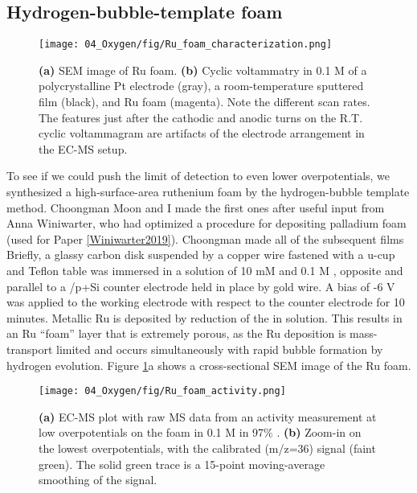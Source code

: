 \subsection{Hydrogen-bubble-template  foam}\label{subsec:Ru_foam}

\begin{figure}[t!]
	\centering
	\texttt{[image: 04\_Oxygen/fig/Ru\_foam\_characterization.png]}
	\caption{\textbf{(a)} SEM image of Ru foam. \textbf{(b)} Cyclic voltammatry in 0.1 M  of a polycrystalline Pt electrode (gray), a room-temperature sputtered  film (black), and Ru foam (magenta). Note the different scan rates. The features just after the cathodic and anodic turns on the R.T.  cyclic voltammagram are artifacts of the electrode arrangement in the EC-MS setup.}
	\label{fig:Ru_foam_char}
\end{figure}

To see if we could push the limit of  detection to even lower overpotentials, we synthesized a high-surface-area ruthenium foam by the hydrogen-bubble template method. Choongman Moon and I made the first ones after useful input from Anna Winiwarter, who had optimized a procedure for depositing palladium foam (used for Paper \ref{Winiwarter2019}). Choongman made all of the subsequent films Briefly, a glassy carbon disk suspended by a copper wire fastened with a u-cup and Teflon table was immersed in a solution of 10 mM  and 0.1 M , opposite and parallel to a /p+Si counter electrode held in place by gold wire. A bias of -6 V was applied to the working electrode with respect to the counter electrode for 10 minutes. Metallic Ru is deposited by reduction of the  in solution. This results in an Ru ``foam'' layer that is extremely porous, as the Ru deposition is mass-transport limited and occurs simultaneously with rapid bubble formation by hydrogen evolution. Figure \ref{fig:Ru_foam_char}a shows a cross-sectional SEM image of the Ru foam.

\begin{figure}[b!]
	\centering
	\texttt{[image: 04\_Oxygen/fig/Ru\_foam\_activity.png]}
	\caption{\textbf{(a)} EC-MS plot with raw MS data from an activity measurement at low overpotentials on the  foam in 0.1 M  in 97\% . \textbf{(b)} Zoom-in on the lowest overpotentials, with the calibrated  (m/z=36) signal (faint green). The solid green trace is a 15-point moving-average smoothing of the  signal.}
	\label{fig:Ru_foam_activity}
\end{figure}

